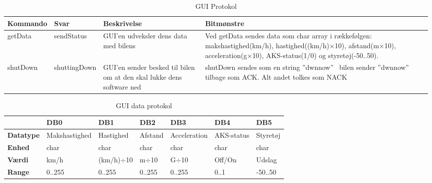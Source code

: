 \begin{table}[h]
	\begin{tabularx}{\textwidth}{| l | l | Z | Z |} \hline

		\textbf{Kommando} 						&
		\textbf{Svar}							&
		\textbf{Beskrivelse}					&
		\textbf{Bitmønstre}						\\ \hline

		getData 	&
		sendStatus 	&
		GUI'en udveksler dens data med bilens 	&
		Ved getData sendes data som char array i rækkefølgen: makshastighed(km/h), hastighed((km/h)$\times$10), afstand(m$\times$10), acceleration(g$\times$10), AKS-status(1/0) og styretøj(-50..50). \\ \hline

		shutDown 	&
		shuttingDown &
		GUI'en sender besked til bilen om at den skal lukke dens software ned &
		shutDown sendes som en string ''dwnnow'' \
bilen sender ''dwnnow'' tilbage som ACK. Alt andet tolkes som NACK \\ \hline

		\end{tabularx}
	\caption{GUI Protokol}
	\label{tbl:prt_gui}
\end{table}

\clearpage

\begin{table}[ht]
	\begin{tabularx}{\textwidth}{| l | l | l | Z | l | l | Z |} \hline

	\textbf{}	&
	\textbf{DB0}	&
	\textbf{DB1}	&
	\textbf{DB2}	&
	\textbf{DB3}	&
	\textbf{DB4}	&
	\textbf{DB5}	\\ \hline

	\textbf{Datatype} & Makshastighed & Hastighed & Afstand & Acceleration & AKS-status & Styretøj \\ \hline
	\textbf{Enhed} & char & char & char & char & char &  char \\ \hline
	\textbf{Værdi} & km/h & (km/h)$\div$10 & m$\div$10 & G$\div$10 & Off/On & Udslag \\ \hline
	\textbf{Range} & 0..255 & 0..255 & 0..255 & 0..255 & 0..1 & -50..50 \\ \hline
	
	\end{tabularx}
	\caption{GUI data protokol}
	\label{tbl:prt_gui_byte}
\end{table}

